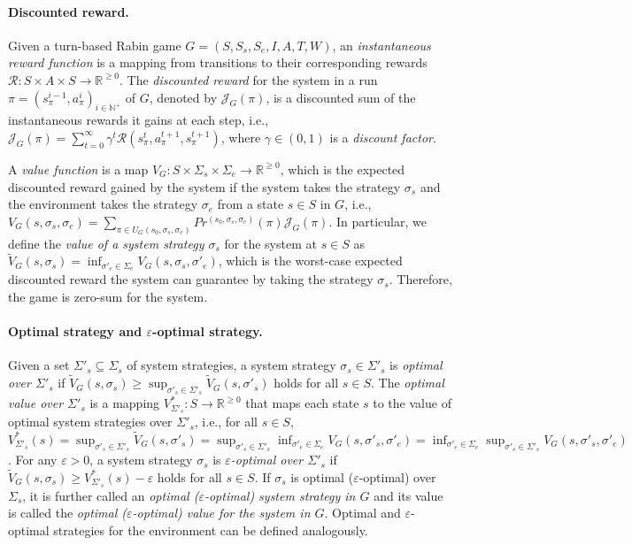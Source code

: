 \documentclass[runningheads,a4paper]{llncs}
\begin{document}
\paragraph{Discounted reward.} Given a turn-based Rabin game $G = (S, S_s, S_e, I, A, T, W)$, an \emph{instantaneous reward function} is a mapping from transitions to their corresponding rewards $\mathcal{R}: S \times A \times S \rightarrow \mathbb{R}^{\geq 0}$. 
The \emph{discounted reward} for the system in a run $\pi = (s_{\pi}^{i-1}, a_{\pi}^i)_{i \in \mathbb{N}^+}$ of $G$, denoted by $\mathcal{J}_G(\pi)$, is a discounted sum of the instantaneous rewards it gains at each step, i.e., $\mathcal{J}_G({\pi}) = \sum_{t=0}^{\infty} \gamma^t \mathcal{R}(s_{\pi}^t, a_{\pi}^{t+1}, s_{\pi}^{t+1})$, where $\gamma \in (0,1)$ is a \emph{discount factor}. 


A \emph{value function} is a map $V_G: S \times \Sigma_s \times \Sigma_e \rightarrow \mathbb{R}^{\geq 0}$, which is the expected discounted reward gained by the system if the system takes the strategy $\sigma_s$ and the environment takes the strategy $\sigma_e$ from a state $s \in S$ in $G$, i.e., $V_G(s, \sigma_s, \sigma_e) = \sum_{\pi \in U_G(s_0, \sigma_s, \sigma_e)} Pr^{(s_0, \sigma_s, \sigma_e)}(\pi) \mathcal{J}_{G}(\pi)$. In particular, we define the \emph{value of a system strategy $\sigma_s$} for the system at $s \in S$ as $\tilde{V}_G(s, \sigma_s) = \inf_{\sigma'_e \in \Sigma_e} V_G(s, \sigma_s, \sigma'_e)$, which is the worst-case expected discounted reward the system can guarantee by taking the strategy $\sigma_s$. Therefore, the game is zero-sum for the system. 



\paragraph{Optimal strategy and $\varepsilon$-optimal strategy.} Given a set $\Sigma'_s \subseteq \Sigma_s$ of system strategies, a system strategy $\sigma_s \in \Sigma'_s$ is \emph{optimal over $\Sigma'_s$} if $\tilde{V}_G(s, \sigma_s) \geq \sup_{\sigma'_s \in \Sigma'_s} \tilde{V}_G(s, \sigma'_s)$ holds for all $s \in S$. The \emph{optimal value over $\Sigma'_s$} is a mapping $V^*_{\Sigma'_s}: S \rightarrow \mathbb{R}^{\geq 0}$ that maps each state $s$ to the value of optimal system strategies over $\Sigma'_s$, i.e., for all $s \in S$, $V^*_{\Sigma'_s}(s) = \sup_{\sigma'_s \in \Sigma'_s} \tilde{V}_G(s, \sigma'_s) = \sup_{\sigma'_s \in \Sigma'_s} \inf_{\sigma'_e \in \Sigma_e} V_G(s, \sigma'_s, \sigma'_e) = \inf_{\sigma'_e \in \Sigma_e} \sup_{\sigma'_s \in \Sigma'_s} V_G(s, \sigma'_s, \sigma'_e)$. For any $\varepsilon > 0$, a system strategy $\sigma_s$ is \emph{$\varepsilon$-optimal over $\Sigma'_s$} if $\tilde{V}_G(s, \sigma_s) \geq V^*_{\Sigma'_s}(s) - \varepsilon$ holds for all $s \in S$. If $\sigma_s$ is optimal ($\varepsilon$-optimal) over $\Sigma_s$, it is further called an \emph{optimal ($\varepsilon$-optimal) system strategy in $G$} and its value is called the \emph{optimal ($\varepsilon$-optimal) value for the system in $G$}. 
Optimal and $\varepsilon$-optimal strategies for the environment can be defined analogously. 
\end{document}
